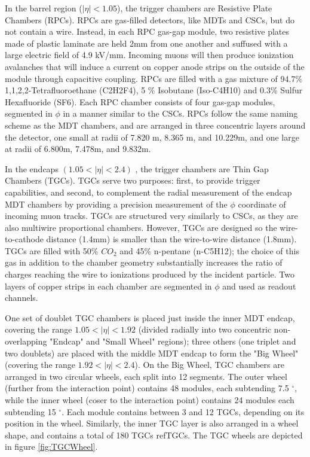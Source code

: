 In the barrel region ($| \eta | < 1.05 $), the trigger chambers are Resistive Plate Chambers (RPCs). RPCs are gas-filled detectors, like MDTs and CSCs, but do not contain a wire. Instead, in each RPC gas-gap module, two resistive plates made of plastic laminate are held 2mm from one another and suffused with a large electric field of 4.9 kV/mm. Incoming muons will then produce ionization avalanches that will induce a current on copper anode strips on the outside of the module through capacitive coupling. RPCs are filled with a gas mixture of 94.7\% 1,1,2,2-Tetrafluoroethane (C2H2F4), 5 \% Isobutane (Iso-C4H10) and 0.3\% Sulfur Hexafluoride (SF6). Each RPC chamber consists of four gas-gap modules, segmented in $\phi$ in a manner similar to the CSCs. RPCs follow the same naming scheme as the MDT chambers, and are arranged in three concentric layers around the detector, one small at radii of 7.820 m, 8.365 m, and 10.229m, and one large at radii of 6.800m, 7.478m, and 9.832m.

In the endcaps $(1.05 <|\eta| < 2.4)$ , the trigger chambers are Thin Gap Chambers (TGCs). TGCs serve two purposes: first, to provide trigger capabilities, and second, to complement the radial measurement of the endcap MDT chambers by providing a precision measurement of the $\phi$ coordinate of incoming muon tracks. TGCs are structured very similarly to CSCs, as they are also multiwire proportional chambers. However, TGCs are designed so the wire-to-cathode distance (1.4mm) is smaller than the wire-to-wire distance (1.8mm). TGCs are filled with 50\% $CO_2$ and 45\% n-pentane (n-C5H12); the choice of this gas in addition to the chamber geometry substantially increases the ratio of charges reaching the wire to ionizations produced by the incident particle. Two layers of copper strips in each chamber are segmented in $\phi$ and used as readout channels.

One set of doublet TGC chambers is placed just inside the inner MDT endcap, covering the range $ 1.05 < |\eta| <1.92 $ (divided radially into two concentric non-overlapping "Endcap" and "Small Wheel" regions); three others (one triplet and two doublets) are placed with the middle MDT endcap to form the "Big Wheel" (covering the range $ 1.92 < |\eta| < 2.4$). On the Big Wheel, TGC chambers are arranged in two circular wheels, each split into 12 segments. The outer wheel (further from the interaction point) contains 48 modules, each subtending 7.5 $^{\circ}$, while the inner wheel (coser to the interaction point) contains 24 modules each subtending 15 $^{\circ}$. Each module contains between 3 and 12 TGCs, depending on its position in the wheel. Similarly, the inner TGC layer is also arranged in a wheel shape, and contains a total of 180 TGCs ref{TGCs}. The TGC wheels are depicted in figure \ref{fig:TGCWheel}.

